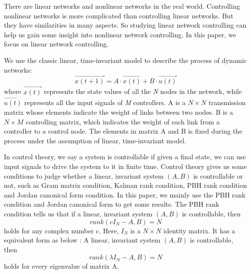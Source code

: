\documentclass[10pt, conference, letterpaper]{IEEEtran}
\begin{document}
There are linear networks and nonlinear networks in the real world. Controlling nonlinear
networks is more complicated than controlling linear networks. But they have similarities in many aspects.
So studying linear network controlling can help us gain some insight into nonlinear network controlling.
In this paper, we focus on linear network controlling.

We use the classic linear, time-invariant model to describe the process of dynamic networks:
\begin{equation}
\overrightarrow {x(t+1)} = A \cdot \overrightarrow {x(t)} + B \cdot \overrightarrow {u(t)}
\end{equation}
where $\overrightarrow {x(t)}$ represents the state values of all the \emph{N} nodes in the network, while $\overrightarrow {u(t)} $ represents all the input signals of \emph{M}
controllers. A is a $N \times N $ transmission matrix whose elements indicate the weight of links between two nodes. B is a $N \times M $
controlling matrix, which indicates the weight of each link from a controller to a control node. The elements in matrix A and B is fixed during the process under the assumption of linear, time-invariant model.

In control theory, we say a system is controllable if given a final state, we can use input signals to drive the system to it in finite time. Control theory gives us some conditions to judge whether a linear, invariant system $ (A,B) $ is controllable or not, such as Gram matrix condition, Kalman rank condition, PBH rank condition and Jordan canonical form condition. In this paper, we mainly use the PBH rank condition  and  Jordan canonical form to get some results.
The PBH rank condition tells us that if a linear, invariant system $ (A,B) $ is controllable, then
\begin{equation}
rank(cI_N - A, B) = N
\end{equation}
holds for any complex number c. Here, $ I_N$ is a $N \times N $ identity matrix. It has a equivalent form as below :
A linear, invariant system $ (A,B) $ is controllable, then
\begin{equation}
rank(\lambda I_N - A, B) = N
\end{equation}
holds for every eigenvalue of matrix A.
\end{document}
